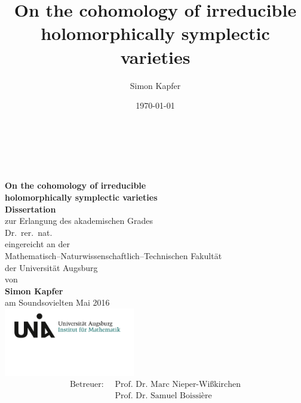 \documentclass[11pt,twoside]{article}
\begin{document}
\title{
\bf On the cohomology of irreducible holomorphically symplectic varieties
}


\author{Simon Kapfer}


\date{\today}
\thispagestyle{empty}
\begin{center}
\ \\
\ \\
\ \\
\textbf{ \LARGE On the cohomology of irreducible\\holomorphically symplectic varieties}
\\
\vspace{1cm}
\Large \textbf{Dissertation} \\
\Large 
\vspace{0.5cm}
\textnormal\large zur Erlangung des akademischen Grades \\
\vspace{5mm}
Dr.~rer.~nat. \\
\vspace{1cm}
eingereicht an der \\
Mathematisch--Naturwissenschaftlich--Technischen Fakult\"at\\
der Universit\"at Augsburg
\\ \vspace{1cm}
von \\
\textbf{Simon Kapfer}\\
\vspace{8mm}
am Soundsovielten Mai 2016 \\
\vspace{15mm}
\includegraphics[height=30mm]{LogoInstitut.png}
\vspace{-10mm}
\begin{align*}
\text{Betreuer: }\ 
& \text{Prof.~Dr.~Marc Nieper-Wi\ss kirchen}\\
& \text{Prof.~Dr.~Samuel Boissi\`ere}
\end{align*}
\end{center}
\cleardoublepage
\end{document}
